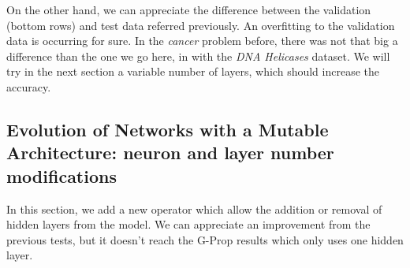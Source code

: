 \documentclass[conference]{IEEEtran}\usepackage[]{graphicx}\usepackage[]{color}
\begin{document}
On the other hand, we can appreciate the difference between the validation
(bottom rows) and test data referred previously.
An overfitting to the validation data is occurring for sure. In the
\emph{cancer} problem before, there was not that big a difference than the one we
go here, in with the \emph{DNA Helicases} dataset. We will try in the next
section a variable number of layers, which should increase the
accuracy. %



\subsection{Evolution of Networks with a Mutable Architecture: neuron and layer number modifications}


In this section, we add a new operator which allow the addition or removal of
hidden layers from the model. We can appreciate %
an improvement from the
previous tests, but it doesn't reach the G-Prop results which only uses one
hidden layer.
\end{document}
